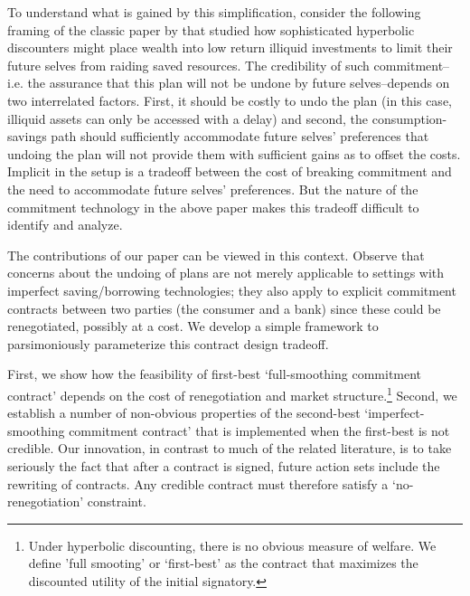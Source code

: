\documentclass[11pt,english]{article}
\theoremstyle{plain}
\theoremstyle{definition}
\begin{document}
To understand what is gained by this simplification, consider the following framing of the classic paper by \citet{laibson1997} that studied how sophisticated hyperbolic discounters might place wealth into low return illiquid investments to limit their future selves from raiding saved resources. The credibility of such commitment--i.e. the assurance that this plan will not be undone by future selves--depends on two interrelated factors. First, it should be costly to undo the plan (in this case, illiquid assets can only be accessed with a delay) and second, the consumption-savings path should sufficiently accommodate future selves' preferences that undoing the plan will not provide them with sufficient gains as to offset the costs. Implicit in the setup is a tradeoff between the cost of breaking commitment and the need to accommodate future selves' preferences. But the nature of the commitment technology in the above paper makes this tradeoff difficult to identify and analyze.

The contributions of our paper can be viewed in this context. Observe that concerns about the undoing of plans are not merely applicable to settings with imperfect saving/borrowing technologies; they also apply to explicit commitment contracts between two parties (the consumer and a bank) since these could be renegotiated, possibly at a cost. We develop a simple framework to parsimoniously parameterize this contract design tradeoff.  

First, we show how the feasibility
of first-best `full-smoothing commitment contract' depends on the
cost of renegotiation and market structure.\footnote{Under hyperbolic discounting, there is no obvious measure of welfare.
We define 'full smooting' or `first-best' as the contract that maximizes the discounted
utility of the initial signatory.} Second, we establish a number of non-obvious properties of the second-best
`imperfect-smoothing commitment contract' that is implemented when
the first-best is not credible. Our innovation, in contrast to much
of the related literature, is to take seriously the fact that after a contract is signed, future action sets include the rewriting of contracts. Any credible contract must therefore satisfy a `no-renegotiation' constraint.
\end{document}
